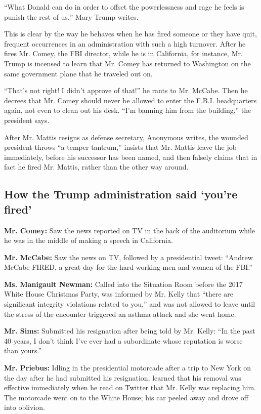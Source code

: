 ``What Donald can do in order to offset the powerlessness and rage he
feels is punish the rest of us,'' Mary Trump writes.

This is clear by the way he behaves when he has fired someone or they
have quit, frequent occurrences in an administration with such a high
turnover. After he fires Mr. Comey, the FBI director, while he is in
California, for instance, Mr. Trump is incensed to learn that Mr. Comey
has returned to Washington on the same government plane that he traveled
out on.

``That's not right! I didn't approve of that!'' he rants to Mr. McCabe.
Then he decrees that Mr. Comey should never be allowed to enter the
F.B.I. headquarters again, not even to clean out his desk. ``I'm banning
him from the building,'' the president says.

After Mr. Mattis resigns as defense secretary, Anonymous writes, the
wounded president throws ``a temper tantrum,'' insists that Mr. Mattis
leave the job immediately, before his successor has been named, and then
falsely claims that in fact he fired Mr. Mattis, rather than the other
way around.

\hypertarget{how-the-trump-administration-said-youre-fired}{%
\subsection{How the Trump administration said `you're
fired'}\label{how-the-trump-administration-said-youre-fired}}

\textbf{Mr. Comey:} Saw the news reported on TV in the back of the
auditorium while he was in the middle of making a speech in California.

\textbf{Mr. McCabe:} Saw the news on TV, followed by a presidential
tweet: ``Andrew McCabe FIRED, a great day for the hard working men and
women of the FBI.''

\textbf{Ms. Manigault Newman:} Called into the Situation Room before the
2017 White House Christmas Party, was informed by Mr. Kelly that ``there
are significant integrity violations related to you,'' and was not
allowed to leave until the stress of the encounter triggered an asthma
attack and she went home.

\textbf{Mr. Sims:} Submitted his resignation after being told by Mr.
Kelly: ``In the past 40 years, I don't think I've ever had a subordinate
whose reputation is worse than yours.''

\textbf{Mr. Priebus:} Idling in the presidential motorcade after a trip
to New York on the day after he had submitted his resignation, learned
that his removal was effective immediately when he read on Twitter that
Mr. Kelly was replacing him. The motorcade went on to the White House;
his car peeled away and drove off into oblivion.

